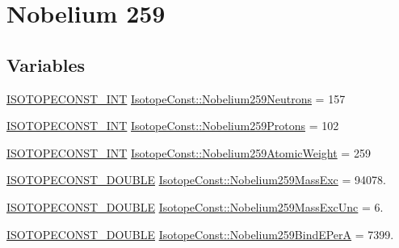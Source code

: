 \hypertarget{group___isotope_const-_nobelium-_no259}{}\section{Nobelium 259}
\label{group___isotope_const-_nobelium-_no259}
\subsection*{Variables}
\begin{DoxyCompactItemize}
\item 
\mbox{\hyperlink{group___isotope_const-_macros_ga5f18360b3e99483a35c32d789e62621c}{I\+S\+O\+T\+O\+P\+E\+C\+O\+N\+S\+T\+\_\+\+I\+NT}} \mbox{\hyperlink{group___isotope_const-_nobelium-_no259_gab123ae1fcedfa2488dfb90f17f2bd390}{Isotope\+Const\+::\+Nobelium259\+Neutrons}} = 157
\item 
\mbox{\hyperlink{group___isotope_const-_macros_ga5f18360b3e99483a35c32d789e62621c}{I\+S\+O\+T\+O\+P\+E\+C\+O\+N\+S\+T\+\_\+\+I\+NT}} \mbox{\hyperlink{group___isotope_const-_nobelium-_no259_gad354d008215e0b21152b7bcb53fccb37}{Isotope\+Const\+::\+Nobelium259\+Protons}} = 102
\item 
\mbox{\hyperlink{group___isotope_const-_macros_ga5f18360b3e99483a35c32d789e62621c}{I\+S\+O\+T\+O\+P\+E\+C\+O\+N\+S\+T\+\_\+\+I\+NT}} \mbox{\hyperlink{group___isotope_const-_nobelium-_no259_ga742365b3f56ed871a6d7b6a4e02939d7}{Isotope\+Const\+::\+Nobelium259\+Atomic\+Weight}} = 259
\item 
\mbox{\hyperlink{group___isotope_const-_macros_ga8f45a7272ce02c0b4c65c44636ed719a}{I\+S\+O\+T\+O\+P\+E\+C\+O\+N\+S\+T\+\_\+\+D\+O\+U\+B\+LE}} \mbox{\hyperlink{group___isotope_const-_nobelium-_no259_ga97416170d03cad7b772626c19e2cb394}{Isotope\+Const\+::\+Nobelium259\+Mass\+Exc}} = 94078.
\item 
\mbox{\hyperlink{group___isotope_const-_macros_ga8f45a7272ce02c0b4c65c44636ed719a}{I\+S\+O\+T\+O\+P\+E\+C\+O\+N\+S\+T\+\_\+\+D\+O\+U\+B\+LE}} \mbox{\hyperlink{group___isotope_const-_nobelium-_no259_ga44612406d3c15015e0f7fcbb86c392ec}{Isotope\+Const\+::\+Nobelium259\+Mass\+Exc\+Unc}} = 6.
\item 
\mbox{\hyperlink{group___isotope_const-_macros_ga8f45a7272ce02c0b4c65c44636ed719a}{I\+S\+O\+T\+O\+P\+E\+C\+O\+N\+S\+T\+\_\+\+D\+O\+U\+B\+LE}} \mbox{\hyperlink{group___isotope_const-_nobelium-_no259_gaefae8f26bf4ca2d74522f5796e4cbedd}{Isotope\+Const\+::\+Nobelium259\+Bind\+E\+PerA}} = 7399.
\item 

\end{DoxyCompactItemize}
